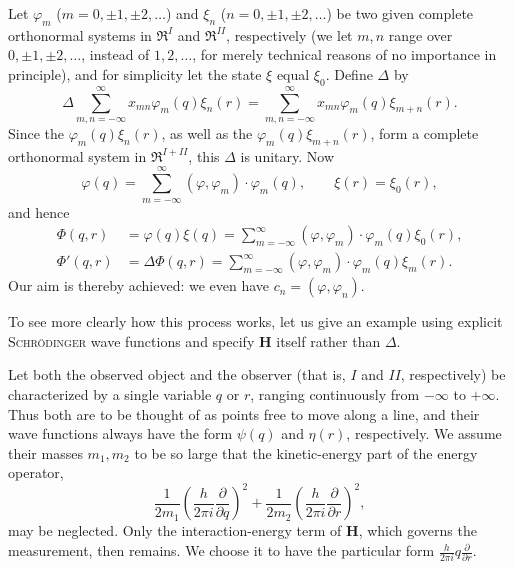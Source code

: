 \documentclass[fontsize=13pt,twoside,openany,headings=normal,parskip=false,bookmarkpackage=false,DIV=calc]{scrbook}
\begin{document}
Let $\varphi_m$ ($m=0,\pm1,\pm2,\ldots$) and $\xi_n$ ($n=0,\pm1,\pm2,\ldots$) be two given complete orthonormal systems in $\mathfrak R^I$ and $\mathfrak R^{II}$, respectively (we let $m,n$ range over $0,\pm1,\pm2,\ldots$, instead of $1,2,\ldots$, for merely technical reasons of no importance in principle), and for simplicity let the state $\xi$ equal $\xi_0$. Define $\Delta$ by
\[
 \Delta\sum_{m,n=-\infty}^{\infty}x_{mn}\varphi_m(q)\xi_n(r)
 =\sum_{m,n=-\infty}^{\infty}x_{mn}\varphi_m(q)\xi_{m+n}(r).
\]
Since the $\varphi_m(q)\xi_n(r)$, as well as the $\varphi_m(q)\xi_{m+n}(r)$, form a complete orthonormal system in $\mathfrak R^{I+II}$, this $\Delta$ is unitary. Now
\[
 \varphi(q)=\sum_{m=-\infty}^{\infty}(\varphi,\varphi_m)\cdot\varphi_m(q),\qquad
 \xi(r)=\xi_0(r),
\]
and hence
\begin{align*}
 \Phi(q,r)&=\varphi(q)\xi(q)
 =\sum_{m=-\infty}^{\infty}(\varphi,\varphi_m)\cdot\varphi_m(q)\xi_0(r),\\
 \Phi'(q,r)&=\Delta\Phi(q,r)
 =\sum_{m=-\infty}^{\infty}(\varphi,\varphi_m)\cdot\varphi_m(q)\xi_m(r).
\end{align*}
Our aim is thereby achieved: we even have $c_n=(\varphi,\varphi_n)$.
\hypertarget{origpage-236}{}%

To see more clearly how this process works, let us give an example using explicit \textsc{Schrödinger} wave functions and specify $\boldsymbol H$ itself rather than $\Delta$.

Let both the observed object and the observer (that is, $I$ and $II$, respectively) be characterized by a single variable $q$ or $r$, ranging continuously from $-\infty$ to $+\infty$. Thus both are to be thought of as points free to move along a line, and their wave functions always have the form $\psi(q)$ and $\eta(r)$, respectively. We assume their masses $m_1,m_2$ to be so large that the kinetic-energy part of the energy operator,
\[
 \frac{1}{2m_1}\left(\frac{h}{2\pi i}\frac{\partial}{\partial q}\right)^2
 +\frac{1}{2m_2}\left(\frac{h}{2\pi i}\frac{\partial}{\partial r}\right)^2,
\]
may be neglected. Only the interaction-energy term of $\boldsymbol H$, which governs the measurement, then remains. We choose it to have the particular form $\frac{h}{2\pi i}q\frac{\partial}{\partial r}$.
\end{document}
